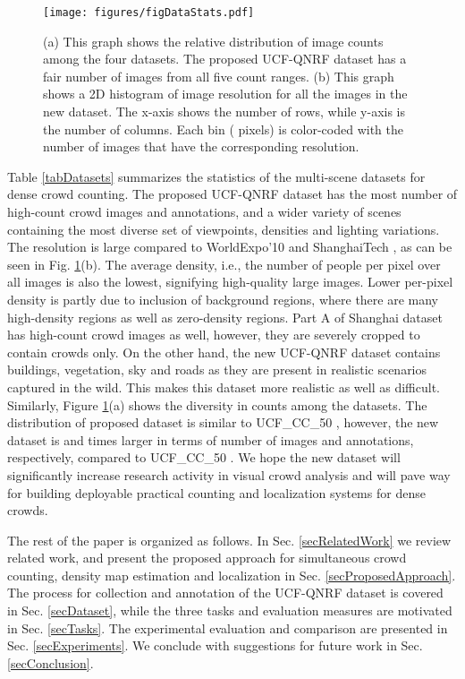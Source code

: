 \documentclass[runningheads]{llncs}
\begin{document}
\begin{figure}[t]
\centering
\texttt{[image: figures/figDataStats.pdf]}
\caption{{(a) This graph shows the relative distribution of image counts among the four datasets. The proposed UCF-QNRF dataset has a fair number of images from all five count ranges. (b) This graph shows a 2D histogram of image resolution for all the images in the new dataset. The x-axis shows the number of rows, while y-axis is the number of columns. Each bin ( pixels) is color-coded with the number of images that have the corresponding resolution.}}
\label{figDatasetStats}
\end{figure}

Table \ref{tabDatasets} summarizes the statistics of the multi-scene datasets for dense crowd counting. The proposed UCF-QNRF dataset has the most number of high-count crowd images and annotations, and a wider variety of scenes containing the most diverse set of viewpoints, densities and lighting variations. The resolution is large compared to WorldExpo'10 \cite{zhang2015cross} and ShanghaiTech \cite{zhang2016single}, as can be seen in Fig. \ref{figDatasetStats}(b). The average density, i.e., the number of people per pixel over all images is also the lowest, signifying high-quality large images. Lower per-pixel density is partly due to inclusion of background regions, where there are many high-density regions as well as zero-density regions. Part A of Shanghai dataset has high-count crowd images as well, however, they are severely cropped to contain crowds only. On the other hand, the new UCF-QNRF dataset contains buildings, vegetation, sky and roads as they are present in realistic scenarios captured in the wild. This makes this dataset more realistic as well as difficult. Similarly, Figure \ref{figDatasetStats}(a) shows the diversity in counts among the datasets. The distribution of proposed dataset is similar to UCF\_CC\_50 \cite{idrees2013multi}, however, the new dataset is  and  times larger in terms of number of images and annotations, respectively, compared to UCF\_CC\_50 \cite{idrees2013multi}. We hope the new dataset will significantly increase research activity in visual crowd analysis and will pave way for building deployable practical counting and localization systems for dense crowds.

The rest of the paper is organized as follows. In Sec. \ref{secRelatedWork} we review related work, and present the proposed approach for simultaneous crowd counting, density map estimation and localization in Sec. \ref{secProposedApproach}. The process for collection and annotation of the UCF-QNRF dataset is covered in Sec. \ref{secDataset}, while the three tasks and evaluation measures are motivated in Sec. \ref{secTasks}. The experimental evaluation and comparison are presented in Sec. \ref{secExperiments}. We conclude with suggestions for future work in Sec. \ref{secConclusion}.
\end{document}
